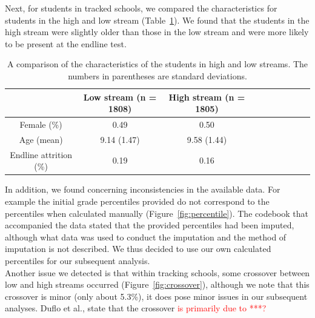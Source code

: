 \documentclass[11pt]{article}
\begin{document}
 
 \noindent Next, for students in tracked schools, we compared the characteristics for students in the high and low stream (Table~\ref{tab:charstream}). We found that the students in the high stream were slightly older than those in the low stream and were more likely to be present at the endline test.
  \begin{table}[H]
 \centering
 \begin{tabular}{cccccccccc}
 \hline
 & Low stream (n = 1808) & High stream (n = 1805)\\
 \hline
Female (\%) & 0.49 & 0.50\\
Age (mean) & 9.14 (1.47) & 9.58 (1.44)\\
Endline attrition (\%) & 0.19 & 0.16\\ \hline
 \end{tabular}
 \caption{A comparison of the characteristics of the students in high and low streams. The numbers in parentheses are standard deviations.}
 \label{tab:charstream}
 \end{table} 
 
 
 \noindent In addition, we found concerning inconsistencies in the available data. For example the initial grade percentiles provided do not correspond to the percentiles when calculated manually (Figure~\ref{fig:percentile}). The codebook that accompanied the data stated that the provided percentiles had been imputed, although what data was used to conduct the imputation and the method of imputation is not described. We thus decided to use our own calculated percentiles for our subsequent analysis.\\
 
Another issue we detected is that within tracking schools, some crossover between low and high streams occurred (Figure~\ref{fig:crossover}), although we note that this crossover is minor (only about 5.3\%), it does pose minor issues in our subsequent analyses. Duflo et al., state that the crossover \textcolor{red}{is primarily due to ***?}

 
 
\end{document}
